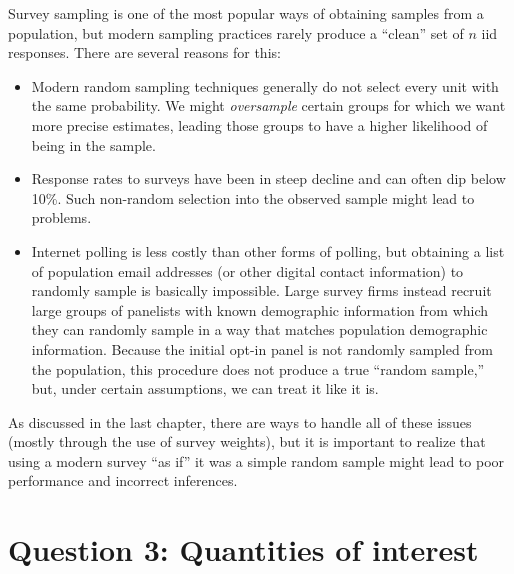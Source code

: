 \documentclass[
  13pt,
  letterpaper,
  DIV=11,
  numbers=noendperiod]{scrreprt}
\theoremstyle{definition}
\theoremstyle{definition}
\theoremstyle{plain}
\theoremstyle{remark}
\begin{document}
\begin{tcolorbox}[enhanced jigsaw, leftrule=.75mm, colbacktitle=quarto-callout-warning-color!10!white, title=\textcolor{quarto-callout-warning-color}{\faExclamationTriangle}\hspace{0.5em}{Warning}, toptitle=1mm, breakable, left=2mm, toprule=.15mm, arc=.35mm, opacitybacktitle=0.6, opacityback=0, colback=white, rightrule=.15mm, titlerule=0mm, colframe=quarto-callout-warning-color-frame, bottomtitle=1mm, bottomrule=.15mm, coltitle=black]

Survey sampling is one of the most popular ways of obtaining samples
from a population, but modern sampling practices rarely produce a
``clean'' set of \(n\) iid responses. There are several reasons for
this:

\begin{itemize}
\item
  Modern random sampling techniques generally do not select every unit
  with the same probability. We might \emph{oversample} certain groups
  for which we want more precise estimates, leading those groups to have
  a higher likelihood of being in the sample.
\item
  Response rates to surveys have been in steep decline and can often dip
  below 10\%. Such non-random selection into the observed sample might
  lead to problems.
\item
  Internet polling is less costly than other forms of polling, but
  obtaining a list of population email addresses (or other digital
  contact information) to randomly sample is basically impossible. Large
  survey firms instead recruit large groups of panelists with known
  demographic information from which they can randomly sample in a way
  that matches population demographic information. Because the initial
  opt-in panel is not randomly sampled from the population, this
  procedure does not produce a true ``random sample,'' but, under
  certain assumptions, we can treat it like it is.
\end{itemize}

As discussed in the last chapter, there are ways to handle all of these
issues (mostly through the use of survey weights), but it is important
to realize that using a modern survey ``as if'' it was a simple random
sample might lead to poor performance and incorrect inferences.

\end{tcolorbox}

\section{Question 3: Quantities of
interest}\label{question-3-quantities-of-interest}
\end{document}
